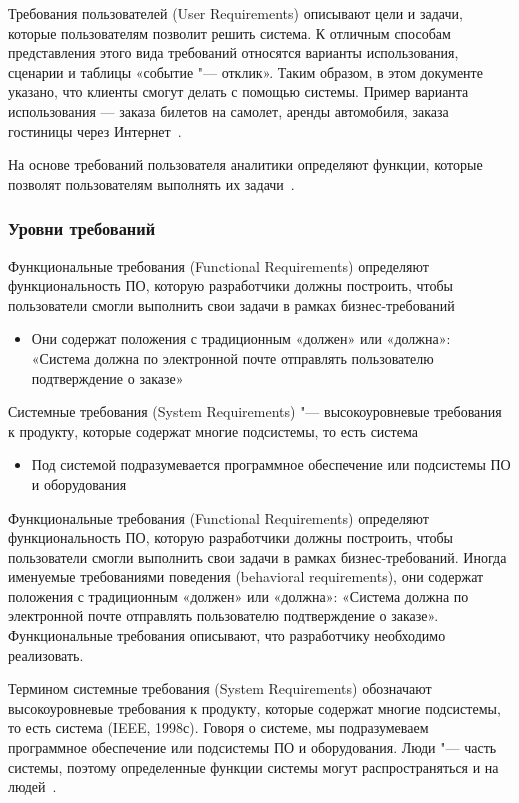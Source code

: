 \documentclass{../industrial-development}
\begin{document}
\alert{Требования пользователей (User Requirements)} описывают цели и задачи, которые пользователям позволит решить система. К отличным способам представления этого вида требований относятся варианты использования, сценарии и таблицы «событие "--- отклик». Таким образом, в этом документе указано, что клиенты смогут делать с помощью системы. Пример варианта использования — заказа билетов на самолет, аренды автомобиля, заказа гостиницы через Интернет~\cite[с.~8--9]{Wiegers}.

На основе требований пользователя аналитики определяют функции, которые позволят пользователям выполнять их задачи~\cite[с.~11]{Wiegers}.


\begin{frame} \frametitle{Уровни требований}
  \begin{block}{}
\alert{Функциональные требования (Functional Requirements)} определяют функциональность ПО, которую разработчики должны построить, чтобы пользователи смогли выполнить свои задачи в рамках бизнес-требований
  \end{block}
 \begin{itemize}
\item Они содержат положения с традиционным «должен» или «должна»: «Система должна по электронной почте отправлять пользователю подтверждение о заказе»
 \end{itemize}
\begin{block}{}
\alert{Системные требования (System Requirements)} "--- высокоуровневые требования к продукту, которые содержат многие подсистемы, то есть система
  \end{block}
 	\begin{itemize}
\item Под системой подразумевается программное обеспечение или подсистемы ПО и оборудования
	\end{itemize}
\end{frame}

\lecturenotes

\alert{Функциональные требования (Functional Requirements)} определяют функциональность ПО, которую разработчики должны построить, чтобы пользователи смогли выполнить свои задачи в рамках бизнес-требований. Иногда именуемые требованиями поведения (behavioral requirements), они содержат положения с традиционным «должен» или «должна»: «Система должна по электронной почте отправлять пользователю подтверждение о заказе». Функциональные требования описывают, что разработчику необходимо реализовать.

Термином \alert{системные требования (System Requirements)} обозначают высокоуровневые требования к продукту, которые содержат многие подсистемы, то есть система (IEEE, 1998с). Говоря о системе, мы подразумеваем программное обеспечение или подсистемы ПО и оборудования. Люди "--- часть системы, поэтому определенные функции системы могут распространяться и на людей~\cite[с.~9]{Wiegers}.
\end{document}
